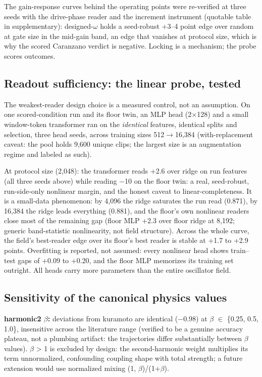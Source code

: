\documentclass{article}
\begin{document}
The gain-response curves behind the operating points were re-verified at
three seeds with the drive-phase reader and the increment instrument
(quotable table in supplementary): designed-\ensuremath{\omega} holds a
seed-robust +3--4 point edge over random at gate size in the mid-gain
band, an edge that vanishes at protocol size, which is why the scored
Caranzano verdict is negative. Locking is a mechanism; the probe scores
outcomes.

\subsection{Readout sufficiency: the linear probe,
tested}\label{readout-sufficiency-the-linear-probe-tested}

The weakest-reader design choice is a measured control, not an
assumption. On one scored-condition run and its floor twin, an MLP head
(2\ensuremath{\times}128) and a small window-token transformer ran on
the \emph{identical} features, identical splits and selection, three
head seeds, across training sizes 512\ensuremath{\to}16,384
(with-replacement caveat: the pool holds 9,600 unique clips; the largest
size is an augmentation regime and labeled as such).

At protocol size (2,048): the transformer reads +2.6 over ridge on run
features (all three seeds above) while reading \ensuremath{-}10 on the
floor twin: a real, seed-robust, run-side-only nonlinear margin, and the
honest caveat to linear-completeness. It is a small-data phenomenon: by
4,096 the ridge saturates the run read (0.871), by 16,384 the ridge
leads everything (0.881), and the floor's own nonlinear readers close
most of the remaining gap (floor MLP +2.3 over floor ridge at 8,192;
generic band-statistic nonlinearity, not field structure). Across the
whole curve, the field's best-reader edge over its floor's best reader
is stable at +1.7 to +2.9 points. Overfitting is reported, not assumed:
every nonlinear head shows train--test gaps of +0.09 to +0.20, and the
floor MLP memorizes its training set outright. All heads carry more
parameters than the entire oscillator field.

\subsection{Sensitivity of the canonical physics
values}\label{sensitivity-of-the-canonical-physics-values}

\textbf{harmonic2 \ensuremath{\beta}:} deviations from kuramoto are
identical (\ensuremath{-}0.98) at \ensuremath{\beta} \ensuremath{\in}
\{0.25, 0.5, 1.0\}, insensitive across the literature range
\citep{hansel1993, daido1992} (verified to be a genuine accuracy
plateau, not a plumbing artifact: the trajectories differ substantially
between \ensuremath{\beta} values). \ensuremath{\beta} \textgreater{} 1
is excluded by design: the second-harmonic weight multiplies its term
unnormalized, confounding coupling shape with total strength; a future
extension would use normalized mixing (1,
\ensuremath{\beta})/(1+\ensuremath{\beta}).
\end{document}
